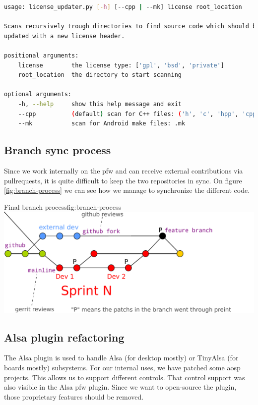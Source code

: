 \begin{lstlisting}[language=bash, caption=License checker usage, label=code:license]
usage: license_updater.py [-h] [--cpp | --mk] license root_location

Scans recursively trough directories to find source code which should be
updated with a new license header.

positional arguments:
    license        the license type: ['gpl', 'bsd', 'private']
    root_location  the directory to start scanning

optional arguments:
    -h, --help     show this help message and exit
    --cpp          (default) scan for C++ files: ('h', 'c', 'hpp', 'cpp')
    --mk           scan for Android make files: .mk
\end{lstlisting}


\subsection{Branch sync process}
Since we work internally on the \gls{pfw} and can receive external contributions via \gls{pullrequests},
it is quite difficult to keep the two repositories in sync.
On figure \ref{fig:branch-process} we can see how we manage to synchronize the different code.

\begin{figureGraphics}{Final branch process}{fig:branch-process}
    \includegraphics[width=\textwidth]{./src/img/branches-process.pdf}
\end{figureGraphics}


\subsection{Alsa plugin refactoring}
The Alsa plugin is used to handle Alsa (for desktop mostly) or TinyAlsa (for boards mostly) subsystems.
For our internal uses, we have patched some \gls{aosp} projects.
This allows us to support different controls.
That control support was also visible in the Alsa \gls{pfw} plugin. Since
we want to open-source the plugin, those proprietary features should be removed.

